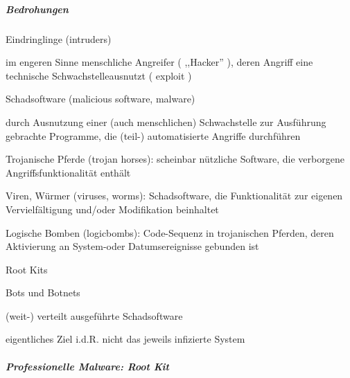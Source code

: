 \documentclass[a4paper]{article}
\begin{document}
\begin{multicols}{3}
    \subparagraph{Bedrohungen}

    \begin{enumerate*}
        \item
        Eindringlinge (intruders)
        \begin{itemize*}
            \item im engeren Sinne menschliche Angreifer ( ,,Hacker'' ), deren Angriff eine technische Schwachstelleausnutzt ( exploit )
        \end{itemize*}
        \item
        Schadsoftware (malicious software, malware)
        \begin{itemize*}
            \item durch Ausnutzung einer (auch menschlichen) Schwachstelle zur Ausführung gebrachte Programme, die (teil-) automatisierte Angriffe durchführen
            \item Trojanische Pferde (trojan horses): scheinbar nützliche Software, die verborgene Angriffsfunktionalität enthält
            \item Viren, Würmer (viruses, worms): Schadsoftware, die Funktionalität zur eigenen Vervielfältigung und/oder Modifikation beinhaltet
            \item Logische Bomben (logicbombs): Code-Sequenz in trojanischen Pferden, deren Aktivierung an System-oder Datumsereignisse gebunden ist
            \item Root Kits
        \end{itemize*}
        \item
        Bots und Botnets
        \begin{itemize*}
            \item (weit-) verteilt ausgeführte Schadsoftware
            \item eigentliches Ziel i.d.R. nicht das jeweils infizierte System
        \end{itemize*}
    \end{enumerate*}


    \subparagraph{Professionelle Malware: Root
        Kit}


\end{multicols}
\end{document}
